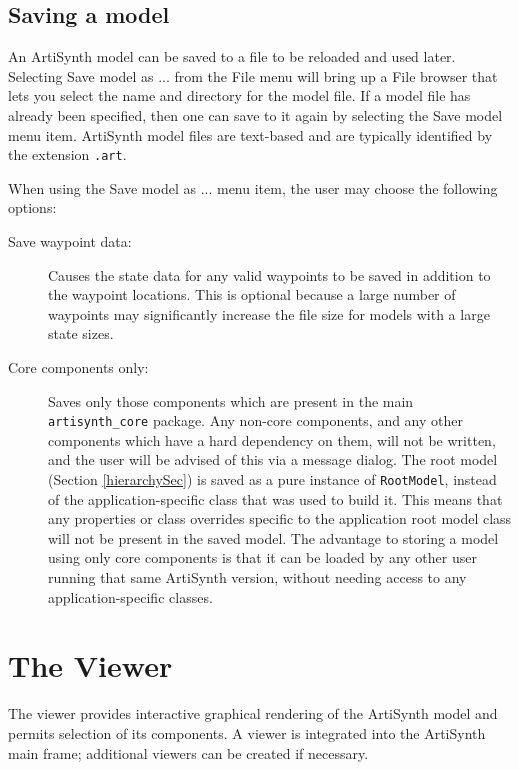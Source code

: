 \documentclass{article}
\begin{document}
\subsection{Saving a model}
\label{SavingSec}

An ArtiSynth model can be saved to a file to be reloaded and used later.
Selecting {\sf Save model as ...} from the {\sf File} menu will bring
up a File browser that lets you select the name and directory for the
model file. If a model file has already been specified, then one can
save to it again by selecting the {\sf Save model} menu item.
ArtiSynth model files are text-based and are typically identified by
the extension {\tt .art}.

When using the {\sf Save model as ...} menu item, the user may choose
the following options:

\begin{description}

\item[Save waypoint data:] \mbox{}

Causes the state data for any valid
waypoints to be saved in addition to the waypoint locations.  This is
optional because a large number of waypoints may significantly
increase the file size for models with a large state sizes.

\item[Core components only:] \mbox{}

Saves only those components which are
present in the main {\tt artisynth\_core} package. Any non-core
components, and any other components which have a hard dependency on
them, will not be written, and the user will be advised of this via a
message dialog.  The root model (Section \ref{hierarchySec}) is saved
as a pure instance of {\tt RootModel}, instead of the
application-specific class that was used to build it. This means that
any properties or class overrides specific to the application root
model class will not be present in the saved model. The advantage to
storing a model using only core components is that it can be loaded by
any other user running that same ArtiSynth version, without needing
access to any application-specific classes.

\end{description}

\section{The Viewer}

The viewer provides interactive graphical rendering of the ArtiSynth
model and permits selection of its components. A viewer is integrated
into the ArtiSynth main frame; additional viewers can be created
if necessary.
\end{document}
